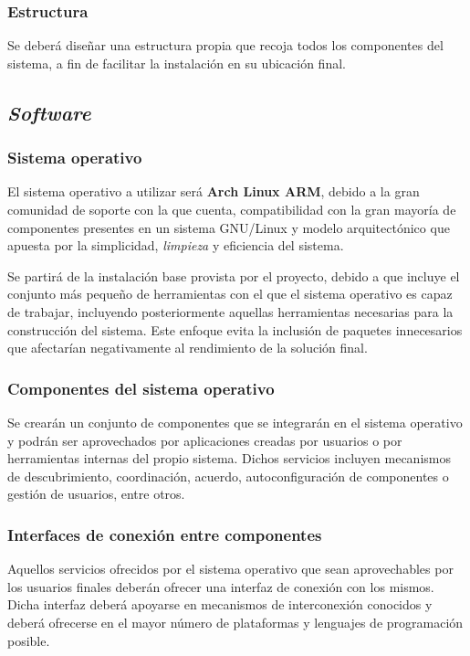 \subsubsection{Estructura}

Se deberá diseñar una estructura propia que recoja todos los componentes del sistema, a fin de facilitar la instalación en su ubicación final.

\subsection{\textit{Software}}

\subsubsection{Sistema operativo}
\label{problema:sistemaoperativo}

El sistema operativo a utilizar será \textbf{Arch Linux ARM}, debido a la gran comunidad de soporte con la que cuenta, compatibilidad con la gran mayoría de componentes presentes en un sistema GNU/Linux y modelo arquitectónico que apuesta por la simplicidad, \textit{limpieza} y eficiencia del sistema.

Se partirá de la instalación base provista por el proyecto, debido a que incluye el conjunto más pequeño de herramientas con el que el sistema operativo es capaz de trabajar, incluyendo posteriormente aquellas herramientas necesarias para la construcción del sistema. Este enfoque evita la inclusión de paquetes innecesarios que afectarían negativamente al rendimiento de la solución final.

\subsubsection{Componentes del sistema operativo}

Se crearán un conjunto de componentes que se integrarán en el sistema operativo y podrán ser aprovechados por aplicaciones creadas por usuarios o por herramientas internas del propio sistema. Dichos servicios incluyen mecanismos de descubrimiento, coordinación, acuerdo, autoconfiguración de componentes o gestión de usuarios, entre otros.

\subsubsection{Interfaces de conexión entre componentes}

Aquellos servicios ofrecidos por el sistema operativo que sean aprovechables por los usuarios finales deberán ofrecer una interfaz de conexión con los mismos. Dicha interfaz deberá apoyarse en mecanismos de interconexión conocidos y deberá ofrecerse en el mayor número de plataformas y lenguajes de programación posible.

